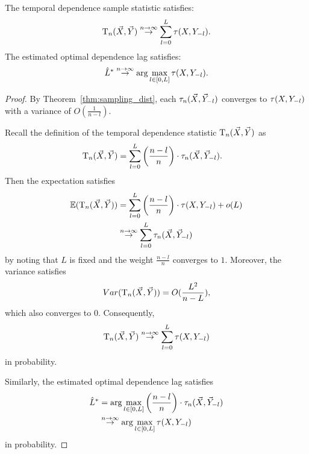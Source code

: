 \begin{theorem}
    The temporal dependence sample statistic satisfies:
    \begin{align*}
     \mathrm{T}_{n}(\vec{X}, \vec{Y}) \stackrel{n \rightarrow \infty}{\rightarrow} \sum_{l=0}^{L}\tau(X, Y_{-l}).
     \end{align*}
     The estimated optimal dependence lag satisfies:
     \begin{align*}
     \hat{L}^{*} \stackrel{n \rightarrow \infty}{\rightarrow} \arg\max_{l \in [0,L]} \tau(X, Y_{-l}).
     \end{align*}
\end{theorem}
\begin{proof}
By Theorem~\ref{thm:sampling_dist}, each $\tau_{n}(\vec{X}, \vec{Y}_{-l})$ converges to $\tau(X, Y_{-l})$ with a variance of $O(\frac{1}{n-l})$.

Recall the definition of the temporal dependence statistic $\mathrm{T}_{n}(\vec{X}, \vec{Y})$ as
\begin{align*}
\mathrm{T}_{n}(\vec{X}, \vec{Y}) &= \sum_{l=0}^{L} \left(\frac{n-l}{n}\right) \cdot \tau_{n}(\vec{X}, \vec{Y}_{-l}).
\end{align*}
Then the expectation satisfies
\begin{align*}
\mathbb{E}(\mathrm{T}_{n}(\vec{X}, \vec{Y})) &= \sum_{l=0}^{L} \left(\frac{n-l}{n}\right) \cdot \tau(X, Y_{-l}) + o(L)\\
&\stackrel{n\rightarrow \infty} \rightarrow \sum_{l=0}^{L} \tau_{n}(\vec{X}, \vec{Y}_{-l})
\end{align*}
by noting that $L$ is fixed and the weight $\frac{n-l}{n}$ converges to $1$. Moreover, the variance satisfies
\begin{align*}
Var(\mathrm{T}_{n}(\vec{X}, \vec{Y})) = O(\frac{L^2}{n-L}),
\end{align*}
which also converges to $0$. Consequently,
\begin{align*}
     \mathrm{T}_{n}(\vec{X}, \vec{Y}) \stackrel{n \rightarrow \infty}{\rightarrow} \sum_{l=0}^{L}\tau(X, Y_{-l})
     \end{align*}
     in probability.
     
Similarly, the estimated optimal dependence lag satisfies 
\begin{align*}
    \hat{L}^{*} &= \arg\max_{l \in [0,L]} \left(\frac{n-l}{n}\right) \cdot \tau_{n}(\vec{X}, \vec{Y}_{-l}) \\
    &\stackrel{n\rightarrow \infty}{\rightarrow} \arg\max_{l \in [0,L]} \tau(X, Y_{-l})
\end{align*}
in probability.
\end{proof}

